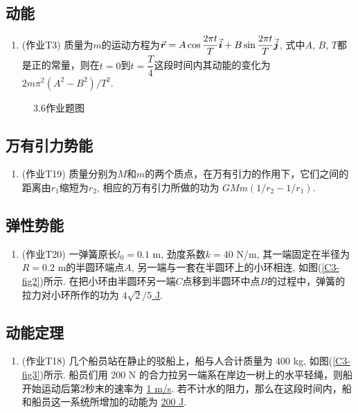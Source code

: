 \subsection{动能}

\begin{enumerate}
	
	\item (作业T3) 质量为$m$的运动方程为$\va*{r} = A \cos \dfrac{2 \pi t}{T} \va*{i} + B \sin \dfrac{2 \pi t}{T} \va*{j}$, 式中$A$, $B$, $T$都是正的常量，则在$t = 0$到$t = \dfrac{T}{4}$这段时间内其动能的变化为 \uline{$2 m \pi^2 (A^2 - B^2) / T^2$}. 
	
\end{enumerate}

\begin{figure}[htbp]
	\centering
	\hspace{0.3in} %
	\hspace{0.3in} %
	\caption{3.6作业题图}
\end{figure}

\subsection{万有引力势能}

\begin{enumerate}
	
	\item (作业T19) 质量分别为$M$和$m$的两个质点，在万有引力的作用下，它们之间的距离由$r_1$缩短为$r_2$, 相应的万有引力所做的功为 \uline{$GMm(1/r_2 - 1/r_1)$}. 
	
\end{enumerate}

\subsection{弹性势能}

\begin{enumerate}
	
	\item (作业T20) 一弹簧原长$l_0 = 0.1$ m, 劲度系数$k = 40$ N/m, 其一端固定在半径为$R = 0.2$ m的半圆环端点$A$, 另一端与一套在半圆环上的小环相连, 如图(\ref{C3-fig2})所示.  在把小环由半圆环另一端$C$点移到半圆环中点$B$的过程中，弹簧的拉力对小环所作的功为 \uline{$4\sqrt{2}/5$ J}. 
	
\end{enumerate}

\subsection{动能定理}

\begin{enumerate}
	
	\item (作业T18) 几个船员站在静止的驳船上，船与人合计质量为 400 kg, 如图(\ref{C3-fig3})所示. 船员们用 200 N 的合力拉另一端系在岸边一树上的水平轻绳，则船开始运动后第2秒末的速率为 \uline{1 m/s}. 若不计水的阻力，那么在这段时间内，船和船员这一系统所增加的动能为 \uline{200 J}.
	
\end{enumerate}

\newpage

